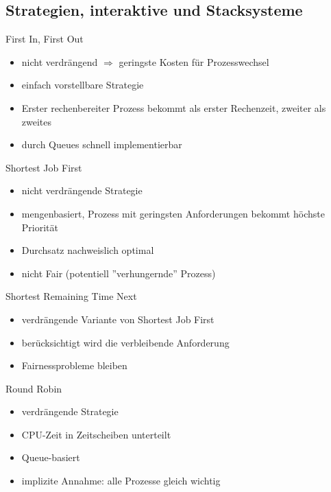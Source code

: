 

\subsection{Strategien, interaktive und Stacksysteme}
\begin{frame}{First In, First Out}
	\begin{itemize}
		\item nicht verdrängend \(\Rightarrow\) geringste Kosten für Prozesswechsel
		\item einfach vorstellbare Strategie
		\item Erster rechenbereiter Prozess bekommt als erster Rechenzeit, zweiter als zweites
		\item durch Queues schnell implementierbar
	\end{itemize}
\end{frame}

\begin{frame}{Shortest Job First}
	\begin{itemize}
		\item nicht verdrängende Strategie
		\item mengenbasiert, Prozess mit geringsten Anforderungen bekommt höchste Priorität
		\item Durchsatz nachweislich optimal
		\item nicht Fair (potentiell ''verhungernde'' Prozess)
	\end{itemize}
\end{frame}

\begin{frame}{Shortest Remaining Time Next}
	\begin{itemize}
		\item verdrängende Variante von Shortest Job First
		\item berücksichtigt wird die verbleibende Anforderung
		\item Fairnessprobleme bleiben
	\end{itemize}
\end{frame}

\begin{frame}{Round Robin}
	\begin{itemize}
		\item<2-> verdrängende Strategie
		\item<3-> CPU-Zeit in Zeitscheiben unterteilt
		\item<4-> Queue-basiert
		\item<5-> implizite Annahme: alle Prozesse gleich wichtig
	\end{itemize}
\end{frame}

